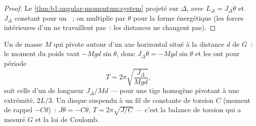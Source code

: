 \begin{proof}
Le \cref{thm:b1:angular-momentum:system} projeté sur $\Delta$, avec $L_\Delta
= J_\Delta\dot\theta$ et $J_\Delta$ constant pour un ~; on multiplie
par $\dot\theta$ pour la forme énergétique (les forces intérieures d'un
 ne travaillent pas~: les distances ne changent pas).
\end{proof}

\begin{example}\label{ex:b1:systems-of-points:pendulums}
Un  de masse $M$ qui pivote autour d'un axe horizontal situé à la
distance $d$ de $G$~: le moment du poids vaut $-Mgd\sin\theta$, donc $J_\Delta\ddot\theta =
-Mgd\sin\theta$ et les  ont pour période
\[
T = 2\pi\sqrt{\frac{J_\Delta}{Mgd}} ,
\]
soit celle d'un  de longueur $J_\Delta/Md$ --- pour une
tige homogène pivotant à une extrémité, $2L/3$. Un disque suspendu à un
fil de constante de torsion $C$ (moment de rappel $-C\theta$)~:
$J\ddot\theta = -C\theta$, $T = 2\pi\sqrt{J/C}$ --- c'est la balance de
torsion qui a mesuré $G$ et la loi de Coulomb.
\end{example}

